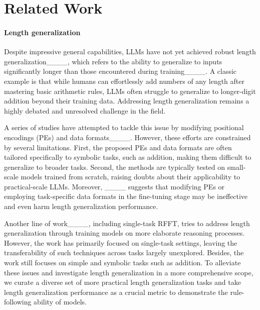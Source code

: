 \section{Related Work}
\paragraph{Length generalization} 
Despite impressive general capabilities, LLMs have not yet achieved robust length generalization____, which refers to the ability to generalize to inputs significantly longer than those encountered during training____. A classic example is that while humans can effortlessly add numbers of any length after mastering basic arithmetic rules, LLMs often struggle to generalize to longer-digit addition beyond their training data. Addressing length generalization remains a highly debated and unresolved challenge in the field.

A series of studies have attempted to tackle this issue by modifying positional encodings (PEs) and data formats____. However, these efforts are constrained by several limitations. First, the proposed PEs and data formats are often tailored specifically to symbolic tasks, such as addition, making them difficult to generalize to broader tasks. Second, the methods are typically tested on small-scale models trained from scratch, raising doubts about their applicability to practical-scale LLMs. Moreover, ____ suggests that modifying PEs or employing task-specific data formats in the fine-tuning stage may be ineffective and even harm length generalization performance.

Another line of work____, including single-task RFFT, tries to address length generalization through training models on more elaborate reasoning processes. However, the work has primarily focused on single-task settings, leaving the transferability of such techniques across tasks largely unexplored. Besides, the work still focuses on simple and symbolic tasks such as addition. To alleviate these issues and investigate length generalization in a more comprehensive scope, we curate a diverse set of more practical length generalization tasks and take length generalization performance as a crucial metric to demonstrate the rule-following ability of models.

